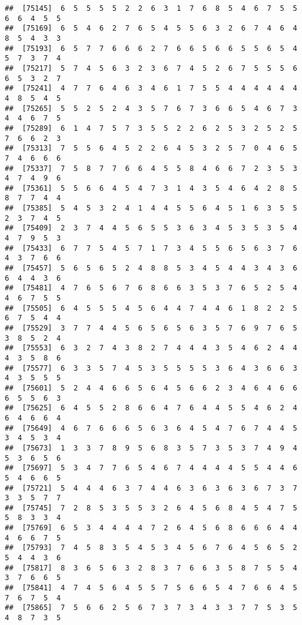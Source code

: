 \documentclass[
]{book}
\begin{document}
\begin{verbatim}
##  [75145]  6  5  5  5  5  2  2  6  3  1  7  6  8  5  4  6  7  5  5  6  6  4  5  5
##  [75169]  6  5  4  6  2  7  6  5  4  5  5  6  3  2  6  7  4  6  4  8  5  4  3  3
##  [75193]  6  5  7  7  6  6  6  2  7  6  6  5  6  6  5  5  6  5  4  5  7  3  7  4
##  [75217]  5  7  4  5  6  3  2  3  6  7  4  5  2  6  7  5  5  5  6  6  5  3  2  7
##  [75241]  4  7  7  6  4  6  3  4  6  1  7  5  5  4  4  4  4  4  4  4  8  5  4  5
##  [75265]  5  5  2  5  2  4  3  5  7  6  7  3  6  6  5  4  6  7  3  4  4  6  7  5
##  [75289]  6  1  4  7  5  7  3  5  5  2  2  6  2  5  3  2  5  2  5  7  6  6  2  3
##  [75313]  7  5  5  6  4  5  2  2  6  4  5  3  2  5  7  0  4  6  5  7  4  6  6  6
##  [75337]  7  5  8  7  7  6  6  4  5  5  8  4  6  6  7  2  3  5  3  4  7  4  9  6
##  [75361]  5  5  6  6  4  5  4  7  3  1  4  3  5  4  6  4  2  8  5  8  7  7  4  4
##  [75385]  5  4  5  3  2  4  1  4  4  5  5  6  4  5  1  6  3  5  5  2  3  7  4  5
##  [75409]  2  3  7  4  4  5  6  5  5  3  6  3  4  5  3  5  3  5  4  4  7  9  5  3
##  [75433]  6  7  7  5  4  5  7  1  7  3  4  5  5  6  5  6  3  7  6  4  3  7  6  6
##  [75457]  5  6  5  6  5  2  4  8  8  5  3  4  5  4  4  3  4  3  6  6  4  4  3  6
##  [75481]  4  7  6  5  6  7  6  8  6  6  3  5  3  7  6  5  2  5  4  4  6  7  5  5
##  [75505]  6  4  5  5  5  4  5  6  4  4  7  4  4  6  1  8  2  2  5  6  7  5  4  4
##  [75529]  3  7  7  4  4  5  6  5  6  5  6  3  5  7  6  9  7  6  5  3  8  5  2  4
##  [75553]  6  3  2  7  4  3  8  2  7  4  4  4  3  5  4  6  2  4  4  4  3  5  8  6
##  [75577]  6  3  3  5  7  4  5  3  5  5  5  5  3  6  4  3  6  6  3  4  3  5  5  5
##  [75601]  5  2  4  4  6  6  5  6  4  5  6  6  2  3  4  6  4  6  6  6  5  5  6  3
##  [75625]  6  4  5  5  2  8  6  6  4  7  6  4  4  5  5  4  6  2  4  6  4  6  6  4
##  [75649]  4  6  7  6  6  6  5  6  3  6  4  5  4  7  6  7  4  4  5  3  4  5  3  4
##  [75673]  1  3  3  7  8  9  5  6  8  3  5  7  3  5  3  7  4  9  4  5  3  6  5  6
##  [75697]  5  3  4  7  7  6  5  4  6  7  4  4  4  4  5  5  4  4  6  5  4  6  6  5
##  [75721]  5  4  4  4  6  3  7  4  4  6  3  6  3  6  3  6  7  3  7  3  3  5  7  7
##  [75745]  7  2  8  5  3  5  5  3  2  6  4  5  6  8  4  5  4  7  5  5  8  3  3  4
##  [75769]  6  5  3  4  4  4  4  7  2  6  4  5  6  8  6  6  6  4  4  4  6  6  7  5
##  [75793]  7  4  5  8  3  5  4  5  3  4  5  6  7  6  4  5  6  5  2  5  4  4  3  6
##  [75817]  8  3  6  5  6  3  2  8  3  7  6  6  3  5  8  7  5  5  4  3  7  6  6  5
##  [75841]  4  7  4  5  6  4  5  5  7  5  6  6  5  4  7  6  6  4  5  7  6  7  5  4
##  [75865]  7  5  6  6  2  5  6  7  3  7  3  4  3  3  7  7  5  3  5  4  8  7  3  5

\end{verbatim}
\end{document}

